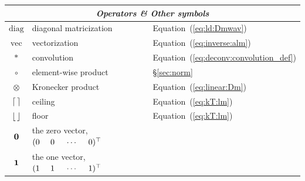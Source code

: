 \documentclass[modern]{aastex631}
\begin{document}
\begin{center}
\begin{longtable}{cll}
        \midrule
        \multicolumn{3}{c}{\emph{Operators \& Other symbols}}                                                                                                           \\
        \midrule
        $\mathrm{diag}$                                     & diagonal matricization                                       & Equation~(\ref{eq:ld:Dmwav})               \\
        $\mathrm{vec}$                                      & vectorization                                                & Equation~(\ref{eq:inverse:alm})          \\
        $*$                                                 & convolution                                                  & Equation~(\ref{eq:deconv:convolution_def}) \\
        $\circ$                                             & element-wise product                                         & \S\ref{sec:norm}           \\
        $\otimes$                                           & Kronecker product                                            & Equation~(\ref{eq:linear:Dm})              \\
        $\ceil*{\,}$                                        & ceiling                                                      & Equation~(\ref{eq:kT:lm})                  \\
        $\floor*{\,}$                                       & floor                                                        & Equation~(\ref{eq:kT:lm})                  \\
        $\bvec{0}$                                          & the zero vector, $(0 \quadquad 0 \quadquad \cdots \quadquad 0)^\top$ &                                                                                                           \\
        $\bvec{1}$                                          & the one vector, $(1 \quadquad 1 \quadquad \cdots \quadquad 1)^\top$ &                                                                                                           \\
    \end{longtable}
\end{center}

\clearpage

\end{document}
